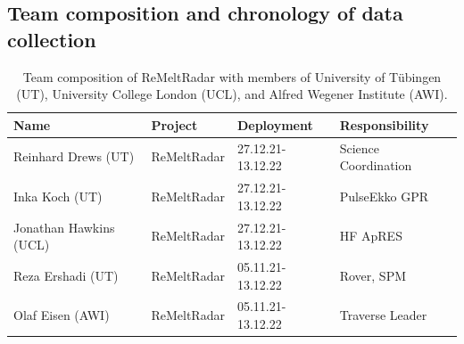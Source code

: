 \documentclass[a4paper,12pt]{article}
\begin{document}
\subsection{Team composition and chronology of data collection}
\begin{table}
\begin{tabular}{llll}
  \rowcolor{gray!50}
  Name & Project& Deployment& Responsibility\\
  \hline
Reinhard Drews (UT) & ReMeltRadar  &27.12.21-13.12.22& Science Coordination\\  
Inka Koch (UT) & ReMeltRadar & 27.12.21-13.12.22& PulseEkko GPR\\
Jonathan Hawkins (UCL) & ReMeltRadar  &27.12.21-13.12.22& HF ApRES\\
Reza Ershadi (UT) & ReMeltRadar &05.11.21-13.12.22& Rover, SPM\\
Olaf Eisen (AWI) & ReMeltRadar  &05.11.21-13.12.22& Traverse Leader\\
  \hline
\end{tabular}
\caption{\label{TableGPR}Team composition of ReMeltRadar with members of University of Tübingen (UT), University College London (UCL), and Alfred Wegener Institute (AWI).}
\end{table}
\end{document}
